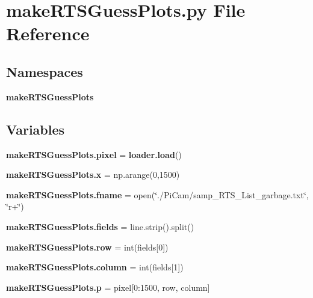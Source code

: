 \section{make\+R\+T\+S\+Guess\+Plots.\+py File Reference}
\label{make_r_t_s_guess_plots_8py}
\subsection*{Namespaces}
\begin{DoxyCompactItemize}
\item 
 \textbf{ make\+R\+T\+S\+Guess\+Plots}
\end{DoxyCompactItemize}
\subsection*{Variables}
\begin{DoxyCompactItemize}
\item 
\textbf{ make\+R\+T\+S\+Guess\+Plots.\+pixel} = \textbf{ loader.\+load}()
\item 
\textbf{ make\+R\+T\+S\+Guess\+Plots.\+x} = np.\+arange(0,1500)
\item 
\textbf{ make\+R\+T\+S\+Guess\+Plots.\+fname} = open(\char`\"{}./Pi\+Cam/samp\+\_\+\+R\+T\+S\+\_\+\+List\+\_\+garbage.\+txt\char`\"{}, \char`\"{}r+\char`\"{})
\item 
\textbf{ make\+R\+T\+S\+Guess\+Plots.\+fields} = line.\+strip().split()
\item 
\textbf{ make\+R\+T\+S\+Guess\+Plots.\+row} = int(fields[0])
\item 
\textbf{ make\+R\+T\+S\+Guess\+Plots.\+column} = int(fields[1])
\item 
\textbf{ make\+R\+T\+S\+Guess\+Plots.\+p} = pixel[0\+:1500, row, column]
\end{DoxyCompactItemize}
